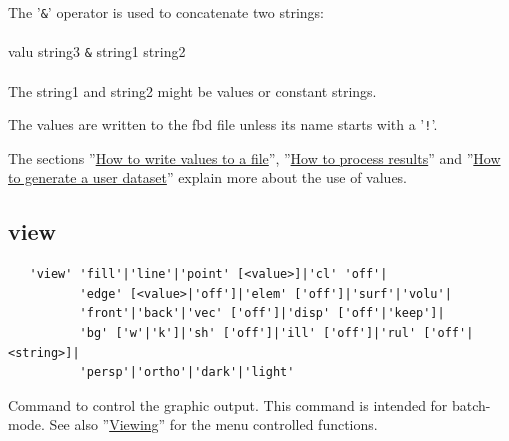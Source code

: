 \documentclass{article}
\providecommand{\htmlref}[2]{\hyperref[#2]{#1}}
\begin{document}
The '\verb_&_' operator is used to concatenate two strings:\\\\valu string3 \verb_&_ string1 string2\\\\The string1 and string2 might be values or constant strings.

The values are written to the fbd file unless its name starts with a '\verb_!_'. 

The sections ''\htmlref{How to write values to a file}{How to write values to a file}'', ''\htmlref{How to process results}{How to process results}'' and ''\htmlref{How to generate a user dataset}{How to generate a user dataset}'' explain more about the use of values.

\subsection{\label{view}view}
\begin{verbatim}
   'view' 'fill'|'line'|'point' [<value>]|'cl' 'off'|
          'edge' [<value>|'off']|'elem' ['off']|'surf'|'volu'|
          'front'|'back'|'vec' ['off']|'disp' ['off'|'keep']|
          'bg' ['w'|'k']|'sh' ['off']|'ill' ['off']|'rul' ['off'|<string>]|
          'persp'|'ortho'|'dark'|'light'
\end{verbatim}
Command to control the graphic output. This command is intended for batch-mode. See also ''\htmlref{Viewing}{Viewing}'' for the menu controlled functions.
\end{document}

